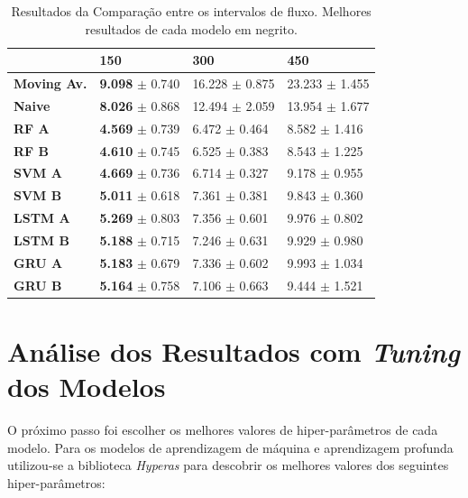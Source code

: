 \begin{table}[H]
    \begin{tabular*}{\linewidth}{@{\extracolsep{\fill}}llll}
    \toprule
     & 
    \multicolumn{1}{l}{\textbf{150}} & 
    \multicolumn{1}{l}{\textbf{300}} &
    \multicolumn{1}{l}{\textbf{450}} \\
    \midrule
    \textbf{Moving Av.} & \textbf{9.098} $\pm$ 0.740 & 16.228 $\pm$ 0.875 & 23.233 $\pm$ 1.455
    \\
    \midrule
    \textbf{Naive} & \textbf{8.026} $\pm$ 0.868 & 12.494 $\pm$ 2.059 & 13.954 $\pm$ 1.677
    \\
    \midrule
    \textbf{RF A} & \textbf{4.569} $\pm$ 0.739 & 6.472 $\pm$ 0.464 & 8.582 $\pm$ 1.416
    \\
    \midrule
    \textbf{RF B} & \textbf{4.610} $\pm$ 0.745 & 6.525 $\pm$ 0.383 & 8.543 $\pm$ 1.225
    \\
    \midrule
    \textbf{SVM A} & \textbf{4.669} $\pm$ 0.736 & 6.714 $\pm$ 0.327 & 9.178 $\pm$ 0.955
    \\
    \midrule
    \textbf{SVM B} & \textbf{5.011} $\pm$ 0.618 & 7.361 $\pm$ 0.381 & 9.843 $\pm$ 0.360
    \\
    \midrule
    \textbf{LSTM A} & \textbf{5.269} $\pm$ 0.803 & 7.356 $\pm$ 0.601 & 9.976 $\pm$ 0.802
    \\
    \midrule
    \textbf{LSTM B} & \textbf{5.188} $\pm$ 0.715 & 7.246 $\pm$ 0.631 & 9.929 $\pm$ 0.980
    \\
    \midrule
    \textbf{GRU A} & \textbf{5.183} $\pm$ 0.679 & 7.336 $\pm$ 0.602 & 9.993 $\pm$ 1.034
    \\
    \midrule
    \textbf{GRU B} & \textbf{5.164} $\pm$ 0.758 & 7.106 $\pm$ 0.663 & 9.444 $\pm$ 1.521
    \\
    \bottomrule
    \end{tabular*}
    \label{table:res_flow}
    \caption{Resultados da Comparação entre os intervalos de fluxo. Melhores resultados de cada modelo em negrito.}
\end{table}


\section{Análise dos Resultados com \textit{Tuning} dos Modelos}

O próximo passo foi escolher os melhores valores de hiper-parâmetros de cada modelo. Para os modelos de aprendizagem de máquina e aprendizagem profunda utilizou-se a biblioteca \textit{Hyperas} para descobrir os melhores valores dos seguintes hiper-parâmetros:

